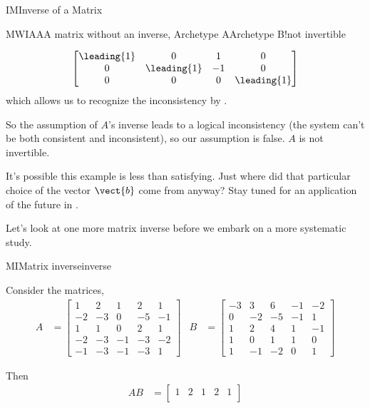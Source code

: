\begin{subsect}{IM}{Inverse of a Matrix}
\begin{example}{MWIAA}{A matrix without an inverse, Archetype A}{Archetype B!not invertible}
\begin{para}
\begin{equation*}
\begin{bmatrix}
\leading{1} & 0 & 1 & 0\\
0 & \leading{1} & -1 & 0\\
0 & 0 & 0 & \leading{1}
\end{bmatrix}
\end{equation*}
%
which allows us to recognize the inconsistency by .\end{para}
%
\begin{para}So the assumption of $A$'s inverse leads to a logical inconsistency (the system can't be both consistent and inconsistent), so our assumption is false.  $A$ is not invertible.\end{para}
%
\begin{para}It's possible this example is less than satisfying.  Just where did that particular choice of the vector $\vect{b}$ come from anyway?  Stay tuned for an application of the future  in .\end{para}
%
\end{example}
%
\begin{para}Let's look at one more matrix inverse before we embark on a more systematic study.\end{para}
%
\begin{example}{MI}{Matrix inverse}{inverse}
\begin{para}Consider the matrices,
%
\begin{align*}
A&=
\begin{bmatrix}
 1 & 2 & 1 & 2 & 1 \\
 -2 & -3 & 0 & -5 & -1 \\
 1 & 1 & 0 & 2 & 1 \\
 -2 & -3 & -1 & -3 & -2 \\
 -1 & -3 & -1 & -3 & 1
\end{bmatrix}
&
B&=
\begin{bmatrix}
 -3 & 3 & 6 & -1 & -2 \\
 0 & -2 & -5 & -1 & 1 \\
 1 & 2 & 4 & 1 & -1 \\
 1 & 0 & 1 & 1 & 0 \\
 1 & -1 & -2 & 0 & 1
\end{bmatrix}
\end{align*}
\end{para}
%
\begin{para}Then
%
\begin{align*}
AB
&=
\begin{bmatrix}
 1 & 2 & 1 & 2 & 1 \\

\end{bmatrix}
\end{align*}
\end{para}
\end{example}
\end{subsect}
